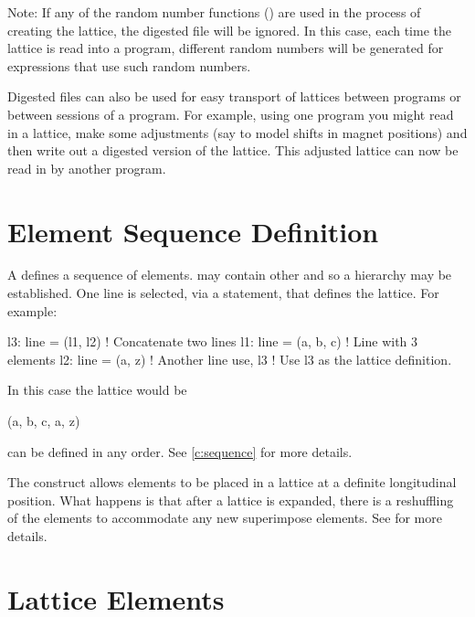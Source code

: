 Note: If any of the random number functions () are used in the process of creating
the lattice, the digested file will be ignored. In this case, each time the lattice is read into a
program, different random numbers will be generated for expressions that use such random numbers.

Digested files can also be used for easy transport of lattices between programs or between sessions
of a program. For example, using one program you might read in a lattice, make some adjustments (say
to model shifts in magnet positions) and then write out a digested version of the lattice. This
adjusted lattice can now be read in by another program.

\section{Element Sequence Definition}

A  defines a sequence of elements.  may contain other  and so a
hierarchy may be established. One line is selected, via a  statement, that defines the
lattice. For example:
\begin{example}
  l3: line = (l1, l2)   ! Concatenate two lines
  l1: line = (a, b, c)  ! Line with 3 elements
  l2: line = (a, z)     ! Another line 
  use, l3               ! Use l3 as the lattice definition.
\end{example}
In this case the lattice would be
\begin{example}
  (a, b, c, a, z)
\end{example}
 can be defined in any order. See \cref{c:sequence} for more
details.

The  construct allows elements to be placed in a lattice at a definite longitudinal
position. What happens is that after a lattice is expanded, there is a reshuffling of the elements
to accommodate any new superimpose elements. See  for more details.

\section{Lattice Elements}

